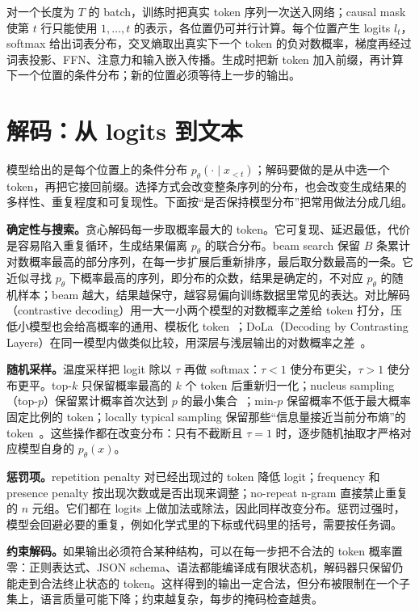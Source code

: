 对一个长度为 \(T\) 的 batch，训练时把真实 token 序列一次送入网络；causal mask 使第 \(t\) 行只能使用 \(1,\ldots,t\) 的表示，各位置仍可并行计算。每个位置产生 logits \(l_t\)，softmax 给出词表分布，交叉熵取出真实下一个 token 的负对数概率，梯度再经过词表投影、FFN、注意力和输入嵌入传播。生成时把新 token 加入前缀，再计算下一个位置的条件分布；新的位置必须等待上一步的输出。

\section{解码：从 logits 到文本}
\label{sec:decoding}

模型给出的是每个位置上的条件分布 \(p_\theta(\cdot\mid x_{<t})\)；解码要做的是从中选一个 token，再把它接回前缀。选择方式会改变整条序列的分布，也会改变生成结果的多样性、重复程度和可复现性。下面按“是否保持模型分布”把常用做法分成几组。

\textbf{确定性与搜索。}贪心解码每一步取概率最大的 token。它可复现、延迟最低，代价是容易陷入重复循环，生成结果偏离 \(p_\theta\) 的联合分布。beam search 保留 \(B\) 条累计对数概率最高的部分序列，在每一步扩展后重新排序，最后取分数最高的一条。它近似寻找 \(p_\theta\) 下概率最高的序列，即分布的众数，结果是确定的，不对应 \(p_\theta\) 的随机样本；beam 越大，结果越保守，越容易偏向训练数据里常见的表达。对比解码（contrastive decoding）用一大一小两个模型的对数概率之差给 token 打分，压低小模型也会给高概率的通用、模板化 token~\cite{li2023contrastive}；DoLa（Decoding by Contrasting Layers）在同一模型内做类似比较，用深层与浅层输出的对数概率之差~\cite{chuang2023dola}。

\textbf{随机采样。}温度采样把 logit 除以 \(\tau\) 再做 softmax：\(\tau<1\) 使分布更尖，\(\tau>1\) 使分布更平。top-\(k\) 只保留概率最高的 \(k\) 个 token 后重新归一化；nucleus sampling（top-\(p\)）保留累计概率首次达到 \(p\) 的最小集合~\cite{holtzman2020curious}；min-\(p\) 保留概率不低于最大概率固定比例的 token；locally typical sampling 保留那些“信息量接近当前分布熵”的 token~\cite{meister2022typical}。这些操作都在改变分布：只有不截断且 \(\tau=1\) 时，逐步随机抽取才严格对应模型自身的 \(p_\theta(x)\)。

\textbf{惩罚项。}repetition penalty 对已经出现过的 token 降低 logit；frequency 和 presence penalty 按出现次数或是否出现来调整；no-repeat n-gram 直接禁止重复的 \(n\) 元组。它们都在 logits 上做加法或除法，因此同样改变分布。惩罚过强时，模型会回避必要的重复，例如化学式里的下标或代码里的括号，需要按任务调。

\textbf{约束解码。}如果输出必须符合某种结构，可以在每一步把不合法的 token 概率置零：正则表达式、JSON schema、语法都能编译成有限状态机，解码器只保留仍能走到合法终止状态的 token。这样得到的输出一定合法，但分布被限制在一个子集上，语言质量可能下降；约束越复杂，每步的掩码检查越贵。

